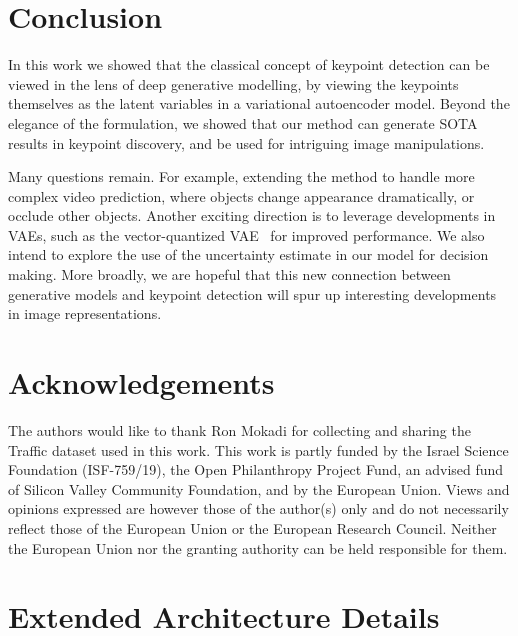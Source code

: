 \documentclass[nohyperref]{article}
\theoremstyle{plain}
\theoremstyle{definition}
\theoremstyle{remark}
\begin{document}
\section{Conclusion}
\label{sec:conc}

In this work we showed that the classical concept of keypoint detection can be viewed in the lens of deep generative modelling, by viewing the keypoints themselves as the latent variables in a variational autoencoder model. Beyond the elegance of the formulation, we showed that our method can generate SOTA results in keypoint discovery, and be used for intriguing image manipulations. 

Many questions remain. For example, extending the method to handle more complex video prediction, where objects change appearance dramatically, or occlude other objects. Another exciting direction is to leverage developments in VAEs, such as the vector-quantized VAE~\citep{razavi2019vqvqae} for improved performance. We also intend to explore the use of the uncertainty estimate in our model for decision making. More broadly, we are hopeful that this new connection between generative models and keypoint detection will spur up interesting developments in image representations.

\section{Acknowledgements}
\label{sec:ack}
The authors would like to thank Ron Mokadi for collecting and sharing the Traffic dataset used in this work. This work is partly funded by the Israel Science Foundation (ISF-759/19), the Open Philanthropy Project Fund, an advised fund of Silicon Valley Community
Foundation, and by the European Union. Views and opinions expressed are however those of the author(s) only and do not necessarily reflect those of the European Union or the European Research Council. Neither the European Union nor the granting authority can be held responsible for them.


\newpage




\newpage
\appendix
\onecolumn
\section{Extended Architecture Details}
\label{apndx:arch}
\end{document}
